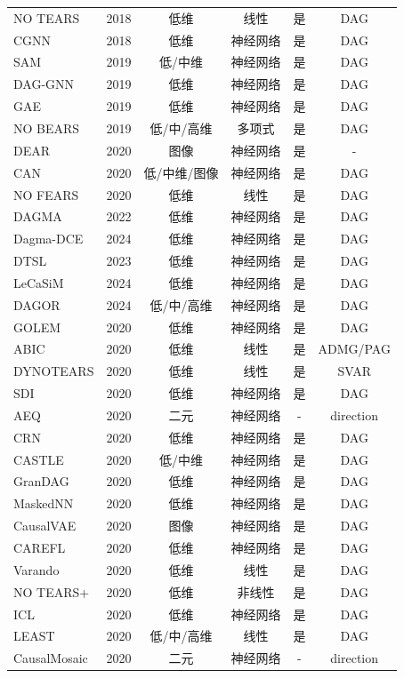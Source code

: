 \begin{longtable}{lc*{4}{c}}
	NO TEARS\cite{Zheng2018} & 2018 & 低维 & 线性 & 是 & DAG \\
	CGNN\cite{Goudet2018} & 2018 & 低维 & 神经网络 & 是 & DAG \\
	SAM\cite{Kalainathan2022} & 2019 & 低/中维 & 神经网络 & 是 & DAG \\
	DAG-GNN\cite{Yu2019} & 2019 & 低维 & 神经网络 & 是 & DAG \\
	GAE\cite{Ng2019} & 2019 & 低维 & 神经网络 & 是 & DAG \\
	NO BEARS\cite{Lee2019} & 2019 & 低/中/高维 & 多项式 & 是 & DAG \\
	DEAR\cite{Shen2020} & 2020 & 图像 & 神经网络 & 是 & - \\
	CAN\cite{Moraffah2020} & 2020 & 低/中维/图像 & 神经网络 & 是 & DAG \\
	NO FEARS\cite{Wei2020} & 2020 & 低维 & 线性 & 是 & DAG \\
	DAGMA\cite{Bello2022} & 2022 & 低维 & 神经网络 & 是 & DAG \\
	Dagma-DCE\cite{Waxman2024} & 2024 & 低维 & 神经网络 & 是 & DAG \\
	DTSL\cite{Berrevoets2023} & 2023 & 低维 & 神经网络 & 是 & DAG \\
	LeCaSiM\cite{Cai2024} & 2024 & 低维 & 神经网络 & 是 & DAG \\
	DAGOR\cite{Zuo2024} & 2024 & 低/中/高维 & 神经网络 & 是 & DAG \\
	GOLEM\cite{Ng2020} & 2020 & 低维 & 神经网络 & 是 & DAG \\
	ABIC\cite{Bhattacharya2021} & 2020 & 低维 & 线性 & 是 & ADMG/PAG \\
	DYNOTEARS\cite{Pamfil2020} & 2020 & 低维 & 线性 & 是 & SVAR \\
	SDI\cite{Ke2019} & 2020 & 低维 & 神经网络 & 是 & DAG \\
	AEQ\cite{Galanti2020} & 2020 & 二元 & 神经网络 & - & direction \\
	CRN\cite{Ke2020} & 2020 & 低维 & 神经网络 & 是 & DAG \\
	CASTLE\cite{Kyono2020} & 2020 & 低/中维 & 神经网络 & 是 & DAG \\
	GranDAG\cite{Lachapelle2020} & 2020 & 低维 & 神经网络 & 是 & DAG \\
	MaskedNN\cite{Ng2022} & 2020 & 低维 & 神经网络 & 是 & DAG \\
	CausalVAE\cite{Yang2021} & 2020 & 图像 & 神经网络 & 是 & DAG \\
	CAREFL\cite{Khemakhem2021} & 2020 & 低维 & 神经网络 & 是 & DAG \\
	Varando\cite{Varando2020} & 2020 & 低维 & 线性 & 是 & DAG \\
	NO TEARS+\cite{Zheng2020a} & 2020 & 低维 & 非线性 & 是 & DAG \\
	ICL\cite{Wang2020} & 2020 & 低维 & 神经网络 & 是 & DAG \\
	LEAST\cite{Zhu2021} & 2020 & 低/中/高维 & 线性 & 是 & DAG \\
	CausalMosaic\cite{Wu2020} & 2020 & 二元 & 神经网络 & - & direction \\
\end{longtable}

